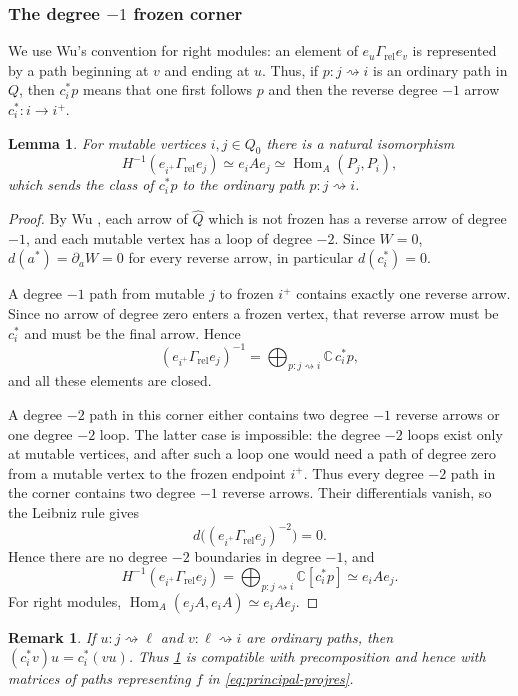\documentclass[11pt,reqno]{article}
\numberwithin{equation}{section}
\newtheorem{lemma}[lemma]{Lemma}
\newtheorem{remark}[remark]{Remark}
\theoremstyle{definition}
\DeclareMathOperator{\Hom}{Hom}
\newcommand{\kk}{\mathbb C}
\begin{document}
\subsubsection{The degree \texorpdfstring{$-1$}{-1} frozen corner}
We use Wu's convention for right modules: an element of $e_u\Gamma_{\mathrm{rel}}e_v$ is represented by a path beginning at $v$ and ending at $u$.  Thus, if $p\colon j\rightsquigarrow i$ is an ordinary path in $Q$, then $c_i^*p$ means that one first follows $p$ and then the reverse degree $-1$ arrow $c_i^*\colon i\to i^+$.

\begin{lemma}\label{lem:corner}
For mutable vertices $i,j\in Q_0$ there is a natural isomorphism
\[
 H^{-1}(e_{i^+}\Gamma_{\mathrm{rel}}e_j)
 \simeq e_iAe_j
 \simeq\Hom_A(P_j,P_i),
\]
which sends the class of $c_i^*p$ to the ordinary path $p\colon j\rightsquigarrow i$.
\end{lemma}
\begin{proof}
By Wu \cite[Definition~7.5]{WuRelative}, each arrow of $\widehat Q$ which is not frozen has a reverse arrow of degree $-1$, and each mutable vertex has a loop of degree $-2$.  Since $W=0$, $d(a^*)=\partial_aW=0$ for every reverse arrow, in particular $d(c_i^*)=0$.

A degree $-1$ path from mutable $j$ to frozen $i^+$ contains exactly one reverse arrow.  Since no arrow of degree zero enters a frozen vertex, that reverse arrow must be $c_i^*$ and must be the final arrow.  Hence
\[
 (e_{i^+}\Gamma_{\mathrm{rel}}e_j)^{-1}
 =\bigoplus_{p:j\rightsquigarrow i}\kk\,c_i^*p,
\]
and all these elements are closed.

A degree $-2$ path in this corner either contains two degree $-1$ reverse arrows or one degree $-2$ loop.  The latter case is impossible: the degree $-2$ loops exist only at mutable vertices, and after such a loop one would need a path of degree zero from a mutable vertex to the frozen endpoint $i^+$.  Thus every degree $-2$ path in the corner contains two degree $-1$ reverse arrows.  Their differentials vanish, so the Leibniz rule gives
\[
 d\bigl((e_{i^+}\Gamma_{\mathrm{rel}}e_j)^{-2}\bigr)=0.
\]
Hence there are no degree $-2$ boundaries in degree $-1$, and
\[
 H^{-1}(e_{i^+}\Gamma_{\mathrm{rel}}e_j)
 =\bigoplus_{p:j\rightsquigarrow i}\kk[c_i^*p]
 \simeq e_iAe_j.
\]
For right modules, $\Hom_A(e_jA,e_iA)\simeq e_iAe_j$.
\end{proof}

\begin{remark}\label{rem:corner-naturality}
If $u\colon j\rightsquigarrow\ell$ and $v\colon\ell\rightsquigarrow i$ are ordinary paths, then $(c_i^*v)u=c_i^*(vu)$.  Thus \cref{lem:corner} is compatible with precomposition and hence with matrices of paths representing $f$ in \eqref{eq:principal-projres}.
\end{remark}
\end{document}
